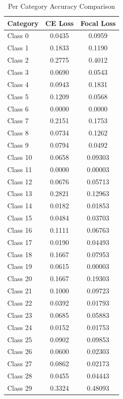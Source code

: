 \documentclass[10pt,twocolumn,letterpaper]{article}
\begin{document}
\begin{table}
\begin{center}
\begin{tabular}{|l|c|c|}
\hline
Category & CE Loss & Focal Loss \\
\hline\hline
Class 0 & 0.0435 & 0.0959 \\
Class 1 & 0.1833 & 0.1190 \\
Class 2 & 0.2775 & 0.4012 \\
Class 3 & 0.0690 & 0.0543 \\
Class 4 & 0.0943 & 0.1831 \\
Class 5 & 0.1209 & 0.0568 \\
Class 6 & 0.0000 & 0.0000 \\
Class 7 & 0.2151 & 0.1753 \\
Class 8 & 0.0734 & 0.1262 \\
Class 9 & 0.0794 & 0.0492 \\
Class 10 & 0.0658 & 0.09303 \\
Class 11 & 0.0000 & 0.00003 \\
Class 12 & 0.0676 & 0.05713 \\
Class 13 & 0.2821 & 0.12963 \\
Class 14 & 0.0182 & 0.01853 \\
Class 15 & 0.0484 & 0.03703 \\
Class 16 & 0.1111 & 0.06763 \\
Class 17 & 0.0190 & 0.04493 \\
Class 18 & 0.1667 & 0.07953 \\
Class 19 & 0.0615 & 0.00003 \\
Class 20 & 0.1667 & 0.19303 \\
Class 21 & 0.1000 & 0.09723 \\
Class 22 & 0.0392 & 0.01793 \\
Class 23 & 0.0685 & 0.05883 \\
Class 24 & 0.0152 & 0.01753 \\
Class 25 & 0.0902 & 0.09853 \\
Class 26 & 0.0600 & 0.02303 \\
Class 27 & 0.0862 & 0.02173 \\
Class 28 & 0.0455 & 0.04443 \\
Class 29 & 0.3324 & 0.48093 \\
\hline
\end{tabular}
\end{center}
\caption{Per Category Accuracy Comparison}
\label{tab:accuracy}
\end{table}
\end{document}
